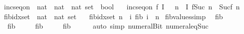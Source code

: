 \begin{isabellebody}
\ inc{\isacharunderscore}{\kern0pt}seq{\isacharunderscore}{\kern0pt}on\ {\isacharcolon}{\kern0pt}{\isacharcolon}{\kern0pt}\ {\isachardoublequoteopen}{\isacharparenleft}{\kern0pt}nat\ {\isasymRightarrow}\ nat{\isacharparenright}{\kern0pt}\ {\isasymRightarrow}\ nat\ set\ {\isasymRightarrow}\ bool{\isachardoublequoteclose}\ \isanewline
\ \ {\isachardoublequoteopen}inc{\isacharunderscore}{\kern0pt}seq{\isacharunderscore}{\kern0pt}on\ f\ I\ {\isacharequal}{\kern0pt}\ {\isacharparenleft}{\kern0pt}{\isasymforall}\ n\ {\isasymin}\ I{\isachardot}{\kern0pt}\ f{\isacharparenleft}{\kern0pt}Suc\ n{\isacharparenright}{\kern0pt}\ {\isachargreater}{\kern0pt}\ Suc{\isacharparenleft}{\kern0pt}f\ n{\isacharparenright}{\kern0pt}{\isacharparenright}{\kern0pt}{\isachardoublequoteclose}\isanewline
\isanewline
{}\isamarkupfalse%
\ fib{\isacharunderscore}{\kern0pt}idx{\isacharunderscore}{\kern0pt}set\ {\isacharcolon}{\kern0pt}{\isacharcolon}{\kern0pt}\ {\isachardoublequoteopen}nat\ {\isasymRightarrow}\ nat\ set{\isachardoublequoteclose}\ \isanewline
\ \ {\isachardoublequoteopen}fib{\isacharunderscore}{\kern0pt}idx{\isacharunderscore}{\kern0pt}set\ n\ {\isacharequal}{\kern0pt}\ {\isacharbraceleft}{\kern0pt}i{\isachardot}{\kern0pt}\ fib\ i\ {\isacharequal}{\kern0pt}\ n{\isacharbraceright}{\kern0pt}{\isachardoublequoteclose}%
\isadelimdocument
%
\endisadelimdocument
%
\isatagdocument
%
\isamarkuptrue%
%
\endisatagdocument
{\isafolddocument}%
%
\isadelimdocument
%
\endisadelimdocument
{}\isamarkupfalse%
\ fib{\isacharunderscore}{\kern0pt}values{\isacharbrackleft}{\kern0pt}simp{\isacharbrackright}{\kern0pt}{\isacharcolon}{\kern0pt}\isanewline
\ \ {\isachardoublequoteopen}fib\ {}\ {\isacharequal}{\kern0pt}\ {}{\isachardoublequoteclose}\isanewline
\ \ {\isachardoublequoteopen}fib\ {}\ {\isacharequal}{\kern0pt}\ {}{\isachardoublequoteclose}\isanewline
\ \ {\isachardoublequoteopen}fib\ {}\ {\isacharequal}{\kern0pt}\ {}{\isachardoublequoteclose}\isanewline
\ \ {\isachardoublequoteopen}fib\ {}\ {\isacharequal}{\kern0pt}\ {}{\isachardoublequoteclose}\isanewline
%
\isadelimproof
\ \ %
\endisadelimproof
%
\isatagproof
{}\isamarkupfalse%
{\isacharparenleft}{\kern0pt}auto\ simp{\isacharcolon}{\kern0pt}\ numeral{\isacharunderscore}{\kern0pt}Bit{}\ numeral{\isacharunderscore}{\kern0pt}eq{\isacharunderscore}{\kern0pt}Suc{\isacharparenright}{\kern0pt}%
\endisatagproof

\end{isabellebody}
